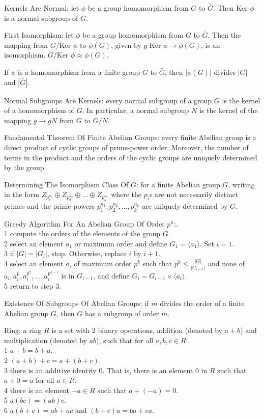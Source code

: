 Kernels Are Normal: let $\phi$ be a group homomorphism from $G$ to $\bar{G}$. Then $\text{Ker }\phi$ is a normal subgroup of $G$.

First Isomorphism: let $\phi$ be a group homomorphism from $G$ to $\bar{G}$. Then the mapping from $G/\text{Ker }\phi$ to $\phi (G)$, given by $g\text{ Ker }\phi \to \phi (G)$, is an isomorphism. $G/\text{Ker }\phi \approx \phi (G)$.

If $\phi$ is a homomorphism from a finite group $G$ to $\bar{G}$, then $|\phi (G)|$ divides $|G|$ and $|\bar{G}|$.

Normal Subgroups Are Kernels: every normal subgroup of a group $G$ is the kernel of a homomorphism of $G$. In particular, a normal subgroup $N$ is the kernel of the mapping $g \to gN$ from $G$ to $G/N$.

Fundamental Theorem Of Finite Abelian Groups: every finite Abelian group is a direct product of cyclic groups of prime-power order. Moreover, the number of terms in the product and the orders of the cyclic groups are uniquely determined by the group.

Determining The Isomorphism Class Of $G$: for a finite Abelian group $G$, writing in the form $Z_{p_1^{n_1}} \oplus Z_{p_2^{n_2}} \oplus \dots \oplus Z_{p_k^{n_k}}$ where the $p_i$s are not necessarily distinct primes and the prime powers $p_1^{n_1},p_2^{n_2},\dots,p_k^{n_k}$ are uniquely determined by $G$.

Greedy Algorithm For An Abelian Group Of Order $p^n$:. \\
1 compute the orders of the elements of the group $G$. \\
2 select an element $a_1$ or maximum order and define $G_1 = \langle a_1 \rangle$. Set $i=1$. \\
3 if $|G|=|G_i|$, stop. Otherwise, replace $i$ by $i+1$. \\
4 select an element $a_i$ of maximum order $p^k$ such that $p^k \le \frac{|G|}{|G_{i-1}|}$ and none of $a_i,a_i^p,a_i^{p^2},\dots,a_i^{p^{k-1}}$ is in $G_{i-1}$, and define $G_i = G_{i-1} \times \langle a_i \rangle$. \\
5 return to step $3$.

Existence Of Subgroups Of Abelian Groups: if $m$ divides the order of a finite Abelian group $G$, then $G$ has a subgroup of order $m$.

Ring: a ring $R$ is a set with $2$ binary operations, addition (denoted by $a+b$) and multiplication (denoted by $ab$), such that for all $a,b,c \in R$:. \\
1 $a+b=b+a$. \\
2 $(a+b)+c=a+(b+c)$. \\
3 there is an additive identity $0$. That is, there is an element $0$ in $R$ such that $a+0=a$ for all $a \in R$. \\
4 there is an element $-a \in R$ such that $a+(-a)=0$. \\
5 $a(bc)=(ab)c$. \\
6 $a(b+c)=ab+ac$ and $(b+c)a=ba+ca$.

